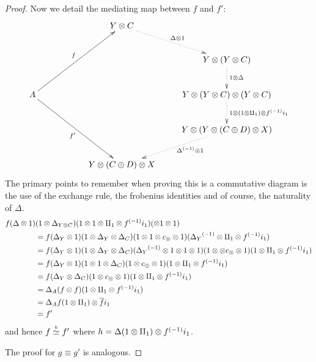 \begin{proof}
  Now we detail the mediating map between $f$ and $f'$:
  \[
    \xymatrix @C=25pt @R=25pt{
      & & Y \* C \ar@{.>}[dr]^{\Delta\* 1}\\
      & & & Y \* (Y\* C) \ar@{.>}[d]^{1\*\Delta}\\
      A \ar[uurr]^f \ar[ddrr]_{f'}
      & & & Y \* (Y\* C)\* (Y\* C) \ar@{.>}[d]^{1\* (1\*\cpa) \* \inv{f} i_1} \\
      & & & Y \* (Y\*(C\+ D)\*X) \ar@{.>}[dl]^(.4){\inv{\Delta}\* 1}\\
      && Y\*(C\+ D)\*X
    }
  \]
  The primary points to remember when proving this is a commutative diagram is the use
  of the exchange rule, the frobenius identities and of course, the naturality of $\Delta$.
  \begin{align*}
    f(\Delta\otimes1)&(1\otimes\Delta_{Y\otimes C})(1\otimes1\otimes\amalg_{1}\otimes{f}^{(-1)}i_1)(\otimes1\otimes1) \\
    &= f(\Delta_Y\otimes1)(1\otimes\Delta_Y\otimes\Delta_C)(1\otimes1\otimes c_{\otimes}\otimes1)({\Delta_Y}^{(-1)}\otimes\amalg_{1}\otimes{f}^{(-1)}i_1) \\
    &= f(\Delta_Y\otimes1)(1\otimes\Delta_Y\otimes\Delta_C)({\Delta_Y}^{(-1)}\otimes1\otimes1\otimes1)(1\otimes\otimes c_{\otimes}\otimes1)(1\otimes\amalg_{1}\otimes{f}^{(-1)}i_1) \\
    &= f(\Delta_Y\otimes1)(1\otimes1\otimes\Delta_C)(1\otimes c_{\otimes}\otimes1)(1\otimes\amalg_{1}\otimes{f}^{(-1)}i_1) \\
    &= f(\Delta_Y\otimes\Delta_C)(1\otimes c_{\otimes}\otimes1)(1\otimes\amalg_{1}\otimes{f}^{(-1)}i_1) \\
    &= \Delta_A (f\otimes f)(1\otimes\amalg_{1}\otimes{f}^{(-1)}i_1) \\
    &= \Delta_A f(1\otimes\amalg_{1})\otimes\overline{f}i_1 \\
    &= f'
  \end{align*}
  and hence $f\overset{\scriptscriptstyle h}{\simeq}f'$ where $h = \Delta (1\otimes\amalg_{1}) \otimes {f}^{(-1)} i_1$.

  The proof for $g\equiv g'$ is analogous.
\end{proof}

